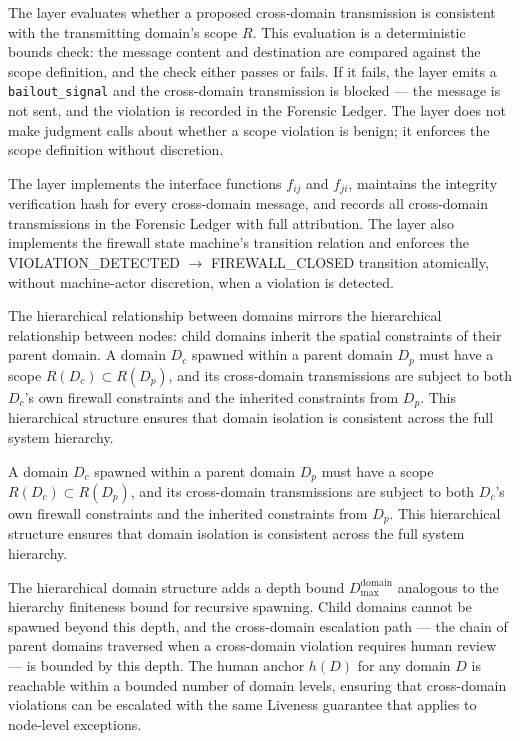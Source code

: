 The \bounds{} layer evaluates whether a proposed cross-domain transmission is consistent with the transmitting domain's scope $R$. This evaluation is a deterministic bounds check: the message content and destination are compared against the scope definition, and the check either passes or fails. If it fails, the \bounds{} layer emits a \texttt{bailout\_signal} and the cross-domain transmission is blocked — the message is not sent, and the violation is recorded in the Forensic Ledger. The \bounds{} layer does not make judgment calls about whether a scope violation is benign; it enforces the scope definition without discretion.

The \fact{} layer implements the interface functions $f_{ij}$ and $f_{ji}$, maintains the integrity verification hash for every cross-domain message, and records all cross-domain transmissions in the Forensic Ledger with full attribution. The layer also implements the firewall state machine's transition relation and enforces the VIOLATION\_DETECTED $\rightarrow$ FIREWALL\_CLOSED transition atomically, without machine-actor discretion, when a violation is detected.

The hierarchical relationship between domains mirrors the hierarchical relationship between nodes: child domains inherit the spatial constraints of their parent domain. A domain $D_c$ spawned within a parent domain $D_p$ must have a scope $R(D_c) \subset R(D_p)$, and its cross-domain transmissions are subject to both $D_c$'s own firewall constraints and the inherited constraints from $D_p$. This hierarchical structure ensures that domain isolation is consistent across the full system hierarchy.

A domain $D_c$ spawned within a parent domain $D_p$ must have a scope $R(D_c) \subset R(D_p)$, and its cross-domain transmissions are subject to both $D_c$'s own firewall constraints and the inherited constraints from $D_p$. This hierarchical structure ensures that domain isolation is consistent across the full system hierarchy.

The hierarchical domain structure adds a depth bound $D_{\max}^{\text{domain}}$ analogous to the hierarchy finiteness bound for recursive spawning. Child domains cannot be spawned beyond this depth, and the cross-domain escalation path — the chain of parent domains traversed when a cross-domain violation requires human review — is bounded by this depth. The human anchor $h(D)$ for any domain $D$ is reachable within a bounded number of domain levels, ensuring that cross-domain violations can be escalated with the same Liveness guarantee that applies to node-level exceptions.

